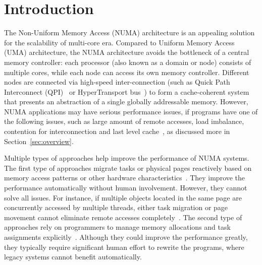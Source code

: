 
\section{Introduction}
\label{sec:intro}

The Non-Uniform Memory Access (NUMA) architecture is an appealing solution for the scalability of multi-core era. Compared to Uniform Memory Access (UMA) architecture, the NUMA architecture avoids the bottleneck of a central memory controller: each processor (also known as a domain or node) consists of multiple cores, while each node can access its own memory controller. Different nodes are connected via high-speed inter-connection (such as Quick Path Interconnect (QPI)~\cite{intelqpi} or HyperTransport bus~\cite{hypertransport}) to form a cache-coherent system that presents an abstraction of a single globally addressable memory. 
However, NUMA applications may have serious performance issues, if programs have one of the following issues, such as large amount of remote accesses, load imbalance, contention for interconnection and last level cache~\cite{Blagodurov:2011:CNC:2002181.2002182, Dashti:2013:TMH:2451116.2451157}, as discussed more in Section~\ref{sec:overview}. 

Multiple types of approaches help improve the performance of NUMA systems. The first type of approaches migrate tasks or physical pages reactively based on memory access patterns or other hardware characteristics~\cite{Blagodurov:2011:CNC:2002181.2002182, AutoNUMA, Dashti:2013:TMH:2451116.2451157, Lepers:2015:TMP:2813767.2813788}. They improve the performance automatically without human involvement. However, they cannot solve all issues. For instance, if multiple objects located in the same page are concurrently accessed by multiple threads, either task migration or page movement cannot eliminate remote accesses completely~\cite{Gaud:2014:LPM:2643634.2643659}. The second type of approaches rely on programmers to manage memory allocations and task assignments explicitly~\cite{Kaestle:2015:SSA:2813767.2813787, Lin:2016:MTP:2872362.2872401, Majo:2017:LPC:3057718.3040222}. Although they could improve the performance greatly, they typically require significant human effort to rewrite the programs, where legacy systems cannot benefit automatically. 



